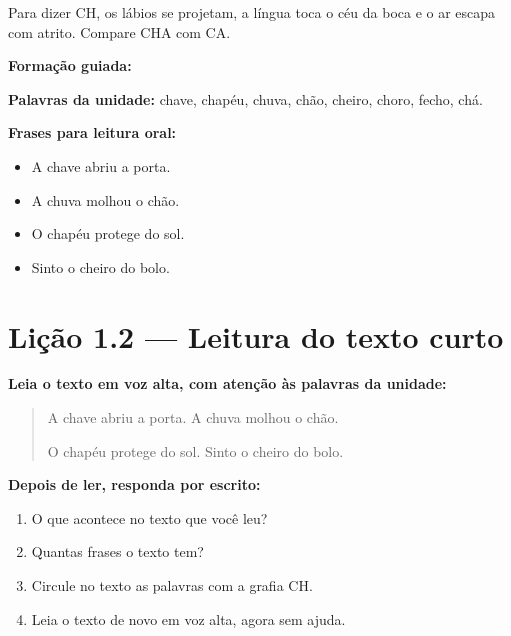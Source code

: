 \begin{boquinha}
Para dizer CH, os lábios se projetam, a língua toca o céu da boca e o ar escapa com atrito. Compare CHA com CA.
\end{boquinha}

\noindent\textbf{Formação guiada:}

\begin{center}
\end{center}

\noindent\textbf{Palavras da unidade:} chave, chapéu, chuva, chão, cheiro, choro, fecho, chá.

\noindent\textbf{Frases para leitura oral:}
\begin{itemize}[leftmargin=1.6em]
  \item A chave abriu a porta.
  \item A chuva molhou o chão.
  \item O chapéu protege do sol.
  \item Sinto o cheiro do bolo.
\end{itemize}

\section{Lição 1.2 --- Leitura do texto curto}

\noindent\textbf{Leia o texto em voz alta, com atenção às palavras da unidade:}


\begin{quote}
A chave abriu a porta. A chuva molhou o chão.

O chapéu protege do sol. Sinto o cheiro do bolo.
\end{quote}

\textbf{Depois de ler, responda por escrito:}
\begin{enumerate}

  \item O que acontece no texto que você leu?
  \begin{center}
  \underline{\hspace{12cm}}
  \end{center}

  \item Quantas frases o texto tem?
  \begin{center}
  \underline{\hspace{12cm}}
  \end{center}

  \item Circule no texto as palavras com a grafia CH.

  \item Leia o texto de novo em voz alta, agora sem ajuda.

\end{enumerate}

